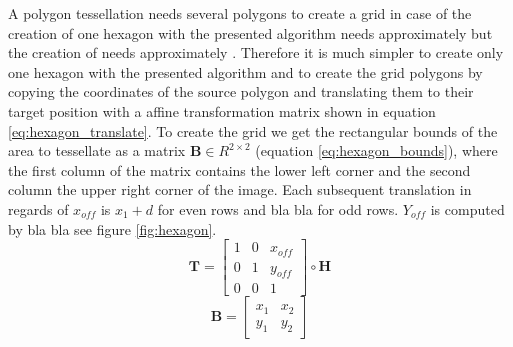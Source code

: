 		A polygon tessellation needs several polygons to create a grid in case of the creation of one hexagon with the presented algorithm needs approximately  but the creation of  needs approximately . Therefore it is much simpler to create only one hexagon with the presented algorithm and to create the grid polygons by copying the coordinates of the source polygon and translating them to their target position with a affine transformation matrix shown in equation \ref{eq:hexagon_translate}. To create the grid we get the rectangular bounds of the area to tessellate as a matrix $\textbf{B} \in R^{2\times2}$ (equation \ref{eq:hexagon_bounds}), where the first column of the matrix contains the lower left corner and the second column the upper right corner of the image. Each subsequent translation in regards of $x_{off}$ is $x_1 + d$ for even rows and bla bla for odd rows. $Y_{off}$ is computed by bla bla see figure \ref{fig:hexagon}.
		\begin{equation}
		\label{eq:hexagon_translate}
		\mathbf{T} =
			\begin{bmatrix}
				1 & 0 & x_{off} \\
				0 & 1 & y_{off} \\
				0 & 0 & 1
			\end{bmatrix} \circ \mathbf{H}
		\end{equation}
		\begin{equation}
		\label{eq:hexagon_bounds}
			\mathbf{B} =
			\begin{bmatrix}
				x_1 & x_2 \\
				y_1 & y_2
			\end{bmatrix}
		\end{equation}
